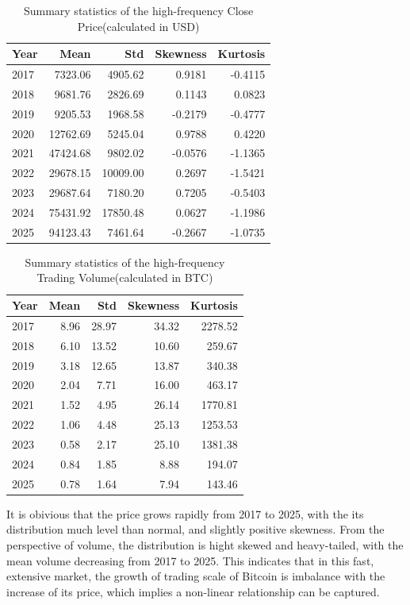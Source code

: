 \documentclass{elsarticle}
\begin{document}
\begin{table}[H]
  \caption{Summary statistics of the high-frequency Close Price(calculated in USD)}
  \label{tab:price_stats}
  \centering
  \begin{tabular}{lrrrr}
    \hline\noalign{\smallskip}
    \textbf{Year} & \textbf{Mean} & \textbf{Std} & \textbf{Skewness} & \textbf{Kurtosis} \\
    \hline\noalign{\smallskip}
    2017 & 7323.06  & 4905.62  & 0.9181   & -0.4115  \\
    2018 & 9681.76  & 2826.69  & 0.1143   & 0.0823   \\
    2019 & 9205.53  & 1968.58  & -0.2179  & -0.4777  \\
    2020 & 12762.69 & 5245.04  & 0.9788   & 0.4220   \\
    2021 & 47424.68 & 9802.02  & -0.0576  & -1.1365  \\
    2022 & 29678.15 & 10009.00 & 0.2697   & -1.5421  \\
    2023 & 29687.64 & 7180.20  & 0.7205   & -0.5403  \\
    2024 & 75431.92 & 17850.48 & 0.0627   & -1.1986  \\
    2025 & 94123.43 & 7461.64  & -0.2667  & -1.0735  \\
    \hline
  \end{tabular}
\end{table}

\begin{table}[H]
  \caption{Summary statistics of the high-frequency Trading Volume(calculated in BTC)}
  \label{tab:volume_stats}
  \centering
  \begin{tabular}{lrrrr}
    \hline\noalign{\smallskip}
    \textbf{Year} & \textbf{Mean} & \textbf{Std} & \textbf{Skewness} & \textbf{Kurtosis} \\
    \hline\noalign{\smallskip}
    2017 & 8.96  & 28.97  & 34.32  & 2278.52 \\
    2018 & 6.10  & 13.52  & 10.60  & 259.67 \\
    2019 & 3.18  & 12.65  & 13.87  & 340.38 \\
    2020 & 2.04  & 7.71   & 16.00  & 463.17 \\
    2021 & 1.52  & 4.95   & 26.14  & 1770.81 \\
    2022 & 1.06  & 4.48   & 25.13  & 1253.53 \\
    2023 & 0.58  & 2.17   & 25.10  & 1381.38 \\
    2024 & 0.84  & 1.85   & 8.88   & 194.07 \\
    2025 & 0.78  & 1.64   & 7.94   & 143.46 \\
    \hline
  \end{tabular}
\end{table}
It is obivious that the price grows rapidly from 2017 to 2025, with the its distribution much level than normal, and slightly positive skewness. From the perspective of volume, the distribution is hight skewed and heavy-tailed, with the mean volume decreasing from 2017 to 2025. This indicates that in this fast, extensive market, the growth of trading scale of Bitcoin is imbalance with the increase of its price, which implies a non-linear relationship can be captured.
\end{document}
